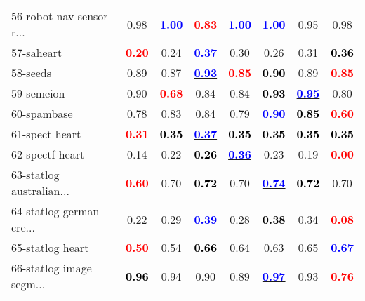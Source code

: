 \begin{table}[h]
\begin{center}
\begin{tabular}{lc|c|c|c|c|c|c}
56-robot nav sensor r... &   0.98 & \textcolor{blue}{\textbf{  1.00}} & \textcolor{red}{\textbf{  0.83}} & \textcolor{blue}{\textbf{  1.00}} & \textcolor{blue}{\textbf{  1.00}} &   0.95 &   0.98 \\
57-saheart & \textcolor{red}{\textbf{  0.20}} &   0.24 & \underline{\textcolor{blue}{\textbf{  0.37}}} &   0.30 &   0.26 &   0.31 & \textcolor{black}{\textbf{  0.36}} \\
58-seeds &   0.89 &   0.87 & \underline{\textcolor{blue}{\textbf{  0.93}}} & \textcolor{red}{\textbf{  0.85}} & \textcolor{black}{\textbf{  0.90}} &   0.89 & \textcolor{red}{\textbf{  0.85}} \\ \hline
59-semeion &   0.90 & \textcolor{red}{\textbf{  0.68}} &   0.84 &   0.84 & \textcolor{black}{\textbf{  0.93}} & \underline{\textcolor{blue}{\textbf{  0.95}}} &   0.80 \\
60-spambase &   0.78 &   0.83 &   0.84 &   0.79 & \underline{\textcolor{blue}{\textbf{  0.90}}} & \textcolor{black}{\textbf{  0.85}} & \textcolor{red}{\textbf{  0.60}} \\
61-spect heart & \textcolor{red}{\textbf{  0.31}} & \textcolor{black}{\textbf{  0.35}} & \underline{\textcolor{blue}{\textbf{  0.37}}} & \textcolor{black}{\textbf{  0.35}} & \textcolor{black}{\textbf{  0.35}} & \textcolor{black}{\textbf{  0.35}} & \textcolor{black}{\textbf{  0.35}} \\
62-spectf heart &   0.14 &   0.22 & \textcolor{black}{\textbf{  0.26}} & \underline{\textcolor{blue}{\textbf{  0.36}}} &   0.23 &   0.19 & \textcolor{red}{\textbf{  0.00}} \\
63-statlog australian... & \textcolor{red}{\textbf{  0.60}} &   0.70 & \textcolor{black}{\textbf{  0.72}} &   0.70 & \underline{\textcolor{blue}{\textbf{  0.74}}} & \textcolor{black}{\textbf{  0.72}} &   0.70 \\ \hline
64-statlog german cre... &   0.22 &   0.29 & \underline{\textcolor{blue}{\textbf{  0.39}}} &   0.28 & \textcolor{black}{\textbf{  0.38}} &   0.34 & \textcolor{red}{\textbf{  0.08}} \\
65-statlog heart & \textcolor{red}{\textbf{  0.50}} &   0.54 & \textcolor{black}{\textbf{  0.66}} &   0.64 &   0.63 &   0.65 & \underline{\textcolor{blue}{\textbf{  0.67}}} \\
66-statlog image segm... & \textcolor{black}{\textbf{  0.96}} &   0.94 &   0.90 &   0.89 & \underline{\textcolor{blue}{\textbf{  0.97}}} &   0.93 & \textcolor{red}{\textbf{  0.76}} \\\end{tabular}\label{tab:balaccClassif1}
\end{center}
\end{table}
